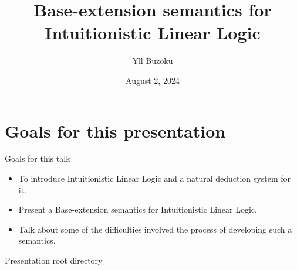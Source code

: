 \documentclass{beamer}
\title[P-tS for ILL]{Base-extension semantics for Intuitionistic Linear Logic}
\author{Yll Buzoku}
\institute[UCL]{%
  Department of Computer Science \\ %
  University College London
}
\date{August 2, 2024}
\begin{document}
\begin{frame}
\titlepage
\end{frame}
\section*{Goals for this presentation}
\begin{frame}{Goals for this talk}
\begin{itemize}%
\item To introduce Intuitionistic Linear Logic and a natural deduction system for it.
\item Present a Base-extension semantics for Intuitionistic Linear Logic.
\item Talk about some of the difficulties involved the process of developing such a semantics.
\end{itemize}
\end{frame}
\begin{frame}{Presentation root directory}
\tableofcontents
\end{frame}
\end{document}
